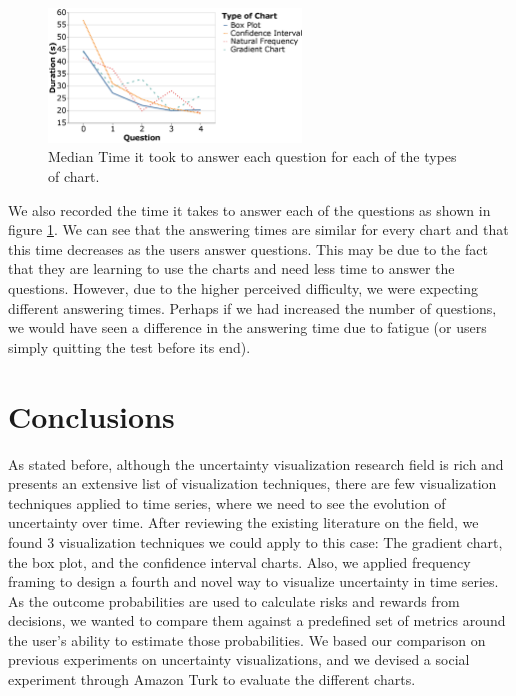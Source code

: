 \documentclass[a4paper,3p,sort&compress]{elsarticle}
\begin{document}
\begin{figure}
  \centering
   \includegraphics[width=0.6\textwidth]{duration_evo2}
  \caption{\label{figure:duration} Median Time it took to answer each question for each of the types of chart.}
\end{figure}

We also recorded the time it takes to answer each of the questions as shown in figure \ref{figure:duration}. We
can see that the answering times are similar for every chart and that this time decreases as the users answer questions.
This may be due to the fact that they are learning to use the charts and need less time to answer the questions.
However, due to the higher perceived difficulty, we were expecting different answering times. Perhaps if we had
increased the number of questions, we would have seen a difference in the answering time due to fatigue (or users simply quitting the test
before its end).


\section{Conclusions}
\label{sec:concl}

As stated before, although the uncertainty visualization research field is rich and presents an extensive list of visualization techniques,
there are few
visualization techniques applied to time series, where we need to see the evolution of uncertainty
over time. After reviewing the existing literature on the field, we found 3 visualization techniques we could apply to this case:
The gradient chart, the box plot, and the confidence interval charts. Also, we applied frequency framing
to design a fourth and novel way to visualize uncertainty in time series.
As the outcome probabilities are used to calculate risks and rewards from decisions, we wanted to compare them against a predefined set of
metrics around the user's ability to estimate those probabilities.
We based our comparison on previous experiments on uncertainty visualizations, and we devised a social experiment through Amazon Turk to
evaluate the different charts.
\end{document}
